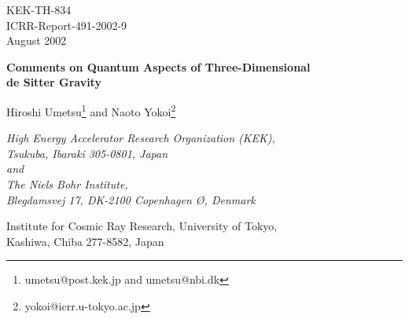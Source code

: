 \documentclass[a4paper,11pt]{article}
\begin{document}
\setlength{\baselineskip}{6mm}


\begin{titlepage}

\begin{flushright}
KEK-TH-834 \\
ICRR-Report-491-2002-9\\
August 2002
\end{flushright}



\vspace{10mm}
\begin{center}
{\Large \bf Comments on Quantum Aspects of Three-Dimensional} \\
{\Large \bf  de Sitter Gravity}

\vspace{10mm}

\renewcommand{\thefootnote}{\fnsymbol{footnote}}

{\large Hiroshi Umetsu}\coordHE{}\footnote{
umetsu@post.kek.jp and umetsu@nbi.dk}  
{\large and Naoto Yokoi}\coordHE{}\footnote{
yokoi@icrr.u-tokyo.ac.jp} 

\renewcommand{\thefootnote}{\arabic{footnote}}
\setcounter{footnote}{0}

\vspace{5mm}

{\it
{}\coordHE{} High Energy Accelerator Research Organization (KEK), \\
     Tsukuba, Ibaraki 305-0801, Japan \\
     and \\
     The Niels Bohr Institute, \\
     Blegdamsvej 17, DK-2100 Copenhagen \O, Denmark

\vspace{5mm}

\coordHE{} Institute for Cosmic Ray Research, University of Tokyo,\\
     Kashiwa, Chiba 277-8582, Japan
}
\end{center}

\vspace{5mm}

\begin{abstract}


\end{abstract}
\end{titlepage}
\end{document}
